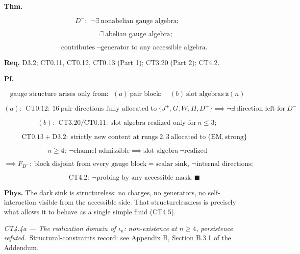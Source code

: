 \begin{theorem}\label{tag:CT4-4}
\textbf{Thm.}

\[
D^-:\ \ \neg\exists\ \text{nonabelian gauge algebra};
\]

\[
\qquad \neg\exists\ \text{abelian gauge algebra};
\]

\[
\qquad \text{contributes}\ \neg\text{generator to any accessible algebra}.
\]

\textbf{Req.} D3.2; CT0.11, CT0.12, CT0.13 (Part 1); CT3.20 (Part 2); CT4.2.

\textbf{Pf.}

\[
\text{gauge structure arises only from}:\ \ (a)\ \text{pair block};\quad (b)\ \text{slot algebras}\ \mathfrak u(n)
\]

\[
(a):\ \ \mathrm{CT0.12}:\ 16\ \text{pair directions fully allocated to}\ \{J^\pm,G,W,H,D^+\}\implies\neg\exists\ \text{direction left for}\ D^-
\]

\[
(b):\ \ \mathrm{CT3.20}/\mathrm{CT0.11}:\ \text{slot algebra realized only for}\ n\le3;
\]

\[
\qquad \mathrm{CT0.13}+\mathrm{D3.2}:\ \text{strictly new content at rungs}\ 2,3\ \text{allocated to}\ \{\mathrm{EM},\mathrm{strong}\}
\]

\[
n\ge4:\ \neg\text{channel-admissible}\implies\text{slot algebra}\ \neg\text{realized}
\]

\[
\implies F_{D^-}:\ \text{block disjoint from every gauge block}=\text{scalar sink},\ \neg\text{internal directions};
\]

\[
\qquad \mathrm{CT4.2}:\ \neg\text{probing by any accessible mask}.\ \blacksquare
\]

\textbf{Phys.} The dark sink is structureless: no charges, no generators, no self-interaction visible from the accessible side. That structurelessness is precisely what allows it to behave as a single simple fluid (CT4.5).

\end{theorem}

\medskip\noindent\textit{\texorpdfstring{CT4.4a — The realization domain of $\iota_n$: non-existence at $n\ge4$, persistence refuted}{CT4.4a - The realization domain of : non-existence at , persistence refuted}.}\ Structural-constraints record: see Appendix B, Section B.3.1 of the Addendum.\par\medskip

